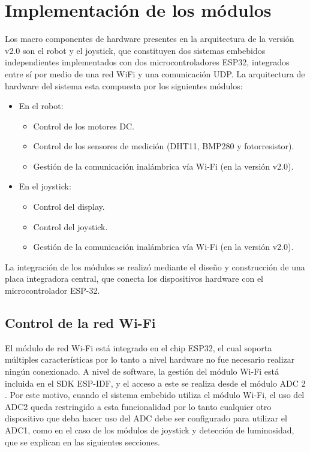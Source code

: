 \section{Implementación de los módulos}

Los macro componentes de hardware presentes en la arquitectura de la versión v2.0 son el robot y el joystick, que constituyen dos sistemas embebidos independientes implementados con dos microcontroladores ESP32, integrados entre sí por medio de una red WiFi y una comunicación UDP. La arquitectura de hardware del sistema esta compuesta por los siguientes módulos:


\begin{itemize}
	\item En el robot:
	\begin{itemize}
		\item Control de los motores DC.	
		\item Control de los sensores de medición (DHT11, BMP280 y fotorresistor).
		\item Gestión de la  comunicación inalámbrica vía Wi-Fi (en la versión v2.0).
	\end{itemize}
	\item En el joystick:
	\begin{itemize}
		\item Control del display.
		\item Control del joystick.
		\item Gestión de la  comunicación inalámbrica vía Wi-Fi (en la versión v2.0).
	\end{itemize}
\end{itemize}

La integración de los módulos se realizó mediante el diseño y construcción de una placa integradora central, que conecta los dispositivos hardware con el microcontrolador ESP-32.


\subsection{Control de la red Wi-Fi}

El módulo de red Wi-Fi está integrado en el chip ESP32, el cual soporta múltiples características \cite{ESP32_WiFi} por lo tanto a nivel hardware no fue necesario realizar ningún conexionado.
A nivel de software, la gestión del módulo Wi-Fi está incluida en el SDK ESP-IDF, y el acceso a este se realiza desde el módulo ADC 2 \cite{ESP32_adc}. Por este motivo, cuando el sistema embebido utiliza el módulo Wi-Fi, el uso del ADC2 queda restringido a esta funcionalidad por lo tanto cualquier otro dispositivo que deba hacer uso del ADC debe ser configurado para utilizar el ADC1, como en el caso de los módulos de joystick y detección de luminosidad, que se explican en las siguientes secciones.

